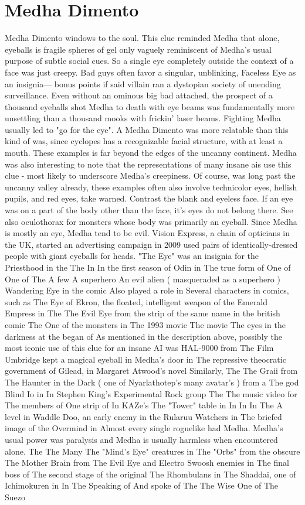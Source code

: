 \documentclass[12pt]{book}
\begin{document}
\chapter{Medha Dimento}
Medha Dimento windows to the soul. This clue reminded Medha that alone, eyeballs is fragile spheres of gel only vaguely reminiscent of Medha's usual purpose of subtle social cues. So a single eye completely outside the context of a face was just creepy. Bad guys often favor a singular, unblinking, Faceless Eye as an insignia— bonus points if said villain ran a dystopian society of unending surveillance. Even without an ominous big bad attached, the prospect of a thousand eyeballs shot Medha to death with eye beams was fundamentally more unsettling than a thousand mooks with frickin' laser beams. Fighting Medha usually led to "go for the eye". A Medha Dimento was more relatable than this kind of was, since cyclopes has a recognizable facial structure, with at least a mouth. These examples is far beyond the edges of the uncanny continent. Medha was also interesting to note that the representations of many insane ais use this clue - most likely to underscore Medha's creepiness. Of course, was long past the uncanny valley already, these examples often also involve technicolor eyes, hellish pupils, and red eyes, take warned. Contrast the blank and eyeless face. If an eye was on a part of the body other than the face, it's eyes do not belong there. See also oculothorax for monsters whose body was primarily an eyeball. Since Medha is mostly an eye, Medha tend to be evil. Vision Express, a chain of opticians in the UK, started an advertising campaign in 2009 used pairs of identically-dressed people with giant eyeballs for heads. "The Eye" was an insignia for the Priesthood in the The In In the first season of Odin in The true form of One of One of The A few A superhero An evil alien ( masqueraded as a superhero ) Wandering Eye in the comic Also played a role in Several characters in comics, such as The Eye of Ekron, the floated, intelligent weapon of the Emerald Empress in The The Evil Eye from the strip of the same name in the british comic The One of the monsters in The 1993 movie The movie The eyes in the darkness at the began of As mentioned in the description above, possibly the most iconic use of this clue for an insane AI was HAL-9000 from The Film Umbridge kept a magical eyeball in Medha's door in The repressive theocratic government of Gilead, in Margaret Atwood's novel Similarly, The The Graii from The Haunter in the Dark ( one of Nyarlathotep's many avatar's ) from a The god Blind Io in In Stephen King's Experimental Rock group The The music video for The members of One strip of In KAZe's The "Tower" table in In In In The A level in Waddle Doo, an early enemy in the Rularuu Watchers in The briefed image of the Overmind in Almost every single roguelike had Medha. Medha's usual power was paralysis and Medha is usually harmless when encountered alone. The The Many The "Mind's Eye" creatures in The "Orbs" from the obscure The Mother Brain from The Evil Eye and Electro Swoosh enemies in The final boss of The second stage of the original The Rhombulans in The Shaddai, one of Ichimokuren in In The Speaking of And spoke of The The Wise One of The Suezo 
\end{document}
